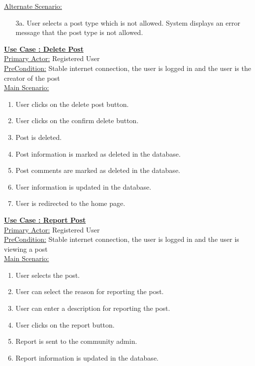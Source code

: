 \documentclass[conference,compsoc]{IEEEtran}
\newcounter{UC}
\newcommand{\nextU}{\stepcounter{UC}\theUC}
\begin{document}
\underline{Alternate Scenario:}\\
\begin{enumerate}
    \item [3a.] User selects a post type which is not allowed. System displays an error message that the post type is not allowed.
\end{enumerate}

\underline{\textbf{Use Case \nextU: Delete Post}}\\

\underline{Primary Actor:} Registered User\\

\underline{PreCondition:} Stable internet connection, the user is logged in and the user is the creator of the post\\

\underline{Main Scenario:}\\
\begin{enumerate}
    \item User clicks on the delete post button.
    \item User clicks on the confirm delete button.
    \item Post is deleted.
    \item Post information is marked as deleted in the database.
    \item Post comments are marked as deleted in the database.
    \item User information is updated in the database.
    \item User is redirected to the home page.
\end{enumerate}

\underline{\textbf{Use Case \nextU: Report Post}}\\

\underline{Primary Actor:} Registered User\\

\underline{PreCondition:} Stable internet connection, the user is logged in and the user is viewing a post\\

\underline{Main Scenario:}\\
\begin{enumerate}
    \item User selects the post.
    \item User can select the reason for reporting the post.
    \item User can enter a description for reporting the post.
    \item User clicks on the report button.
    \item Report is sent to the community admin.
    \item Report information is updated in the database.
\end{enumerate}
\end{document}
